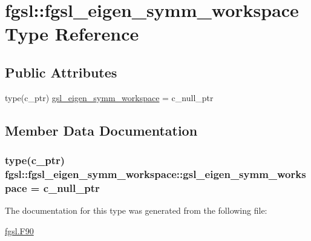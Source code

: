 \hypertarget{structfgsl_1_1fgsl__eigen__symm__workspace}{}\section{fgsl\+:\+:fgsl\+\_\+eigen\+\_\+symm\+\_\+workspace Type Reference}
\label{structfgsl_1_1fgsl__eigen__symm__workspace}
\subsection*{Public Attributes}
\begin{DoxyCompactItemize}
\item 
type(c\+\_\+ptr) \hyperlink{structfgsl_1_1fgsl__eigen__symm__workspace_a42f5fa8f0e6cd50086df8035c7134bcc}{gsl\+\_\+eigen\+\_\+symm\+\_\+workspace} = c\+\_\+null\+\_\+ptr
\end{DoxyCompactItemize}


\subsection{Member Data Documentation}
\hypertarget{structfgsl_1_1fgsl__eigen__symm__workspace_a42f5fa8f0e6cd50086df8035c7134bcc}{}
\subsubsection[{gsl\+\_\+eigen\+\_\+symm\+\_\+workspace}]{\setlength{\rightskip}{0pt plus 5cm}type(c\+\_\+ptr) fgsl\+::fgsl\+\_\+eigen\+\_\+symm\+\_\+workspace\+::gsl\+\_\+eigen\+\_\+symm\+\_\+workspace = c\+\_\+null\+\_\+ptr}\label{structfgsl_1_1fgsl__eigen__symm__workspace_a42f5fa8f0e6cd50086df8035c7134bcc}


The documentation for this type was generated from the following file\+:\begin{DoxyCompactItemize}
\item 
\hyperlink{fgsl_8F90}{fgsl.\+F90}\end{DoxyCompactItemize}
